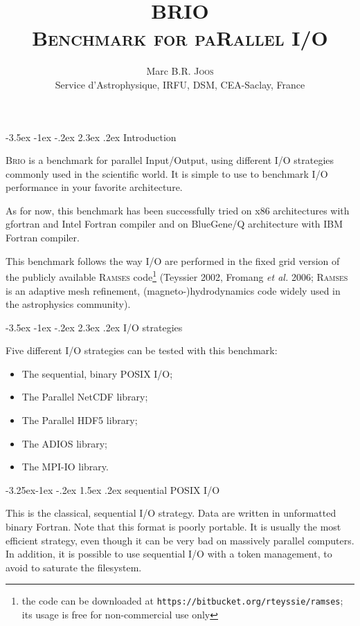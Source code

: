 \documentclass[a4paper,12pt]{article}
\author{Marc B.R. \textsc{Joos} \\ {\small Service d'Astrophysique, IRFU, DSM, CEA-Saclay, France}}
\title{BRIO \\ \textsc{Benchmark for paRallel I/O}}
\date{ }
\makeatletter
\renewcommand{\section}{\@startsection {section}{1}{\z@}%
             {-3.5ex \@plus -1ex \@minus -.2ex}%
             {2.3ex \@plus .2ex}%
             {\normalfont\Large\sffamily\bfseries}}
\renewcommand{\subsection}{\@startsection{subsection}{2}{\z@}%
             {-3.25ex\@plus -1ex \@minus -.2ex}%
             {1.5ex \@plus .2ex}%
             {\normalfont\large\sffamily\bfseries}}
\makeatother
\begin{document}
\maketitle

\section{Introduction}

\textsc{Brio} is a benchmark for parallel Input/Output, using different I/O strategies commonly used in the scientific world. It is simple to use to benchmark I/O performance in your favorite architecture.

As for now, this benchmark has been successfully tried on x86 architectures with gfortran and Intel Fortran compiler and on BlueGene/Q architecture with IBM Fortran compiler.

This benchmark follows the way I/O are performed in the fixed grid version of the publicly available \textsc{Ramses} code\footnote{the code can be downloaded at \texttt{https://bitbucket.org/rteyssie/ramses}; its usage is free for non-commercial use only} (Teyssier 2002, Fromang \emph{et al.} 2006; \textsc{Ramses} is an adaptive mesh refinement, (magneto-)hydrodynamics code widely used in the astrophysics community).

\section{I/O strategies}

Five different I/O strategies can be tested with this benchmark:
\begin{itemize}
  \item The sequential, binary POSIX I/O;
  \item The Parallel NetCDF library;
  \item The Parallel HDF5 library;
  \item The ADIOS library;
  \item The MPI-IO library.
\end{itemize}

\subsection{sequential POSIX I/O}

This is the classical, sequential I/O strategy. Data are written in unformatted binary Fortran. Note that this format is poorly portable. It is usually the most efficient strategy, even though it can be very bad on massively parallel computers. In addition, it is possible to use sequential I/O with a token management, to avoid to saturate the filesystem.
\end{document}
